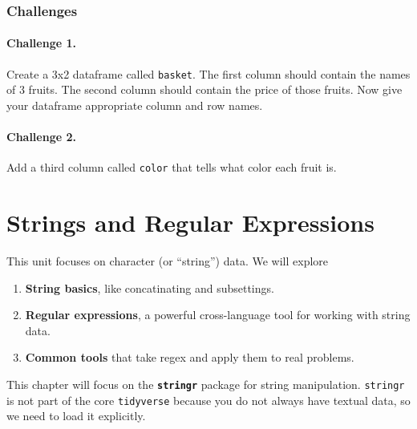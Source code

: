 \documentclass[
]{book}
\providecommand{\tightlist}{%
  \setlength{\itemsep}{0pt}\setlength{\parskip}{0pt}}
\begin{document}
\hypertarget{challenges-14}{%
\subsection{Challenges}\label{challenges-14}}

\hypertarget{challenge-1.-11}{%
\subsubsection*{Challenge 1.}\label{challenge-1.-11}}

Create a 3x2 dataframe called \texttt{basket}. The first column should contain the names of 3 fruits. The second column should contain the price of those fruits. Now give your dataframe appropriate column and row names.

\hypertarget{challenge-2.-10}{%
\subsubsection*{Challenge 2.}\label{challenge-2.-10}}

Add a third column called \texttt{color} that tells what color each fruit is.

\hypertarget{strings-and-regular-expressions}{%
\chapter{Strings and Regular Expressions}\label{strings-and-regular-expressions}}

This unit focuses on character (or ``string'') data. We will explore

\begin{enumerate}
\def\labelenumi{\arabic{enumi}.}
\tightlist
\item
  \textbf{String basics}, like concatinating and subsettings.
\item
  \textbf{Regular expressions}, a powerful cross-language tool for working with string data.
\item
  \textbf{Common tools} that take regex and apply them to real problems.
\end{enumerate}

This chapter will focus on the \textbf{\texttt{stringr}} package for string manipulation. \texttt{stringr} is not part of the core \texttt{tidyverse} because you do not always have textual data, so we need to load it explicitly.
\end{document}
